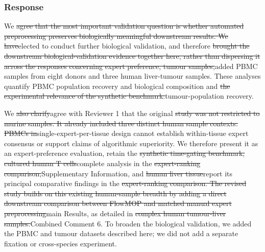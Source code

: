 \documentclass[
  11pt,
  a4paper,
]{article}
\begin{document}
\subsubsection{Response}\label{response-2}

We {\color{revisionred}\sout{agree that the most important validation
question is whether automated preprocessing preserves biologically
meaningful downstream results. We have}}{\color{revisionblue}elected to
conduct further biological validation, and} therefore
{\color{revisionred}\sout{brought the downstream biological-validation
evidence together here, rather than dispersing it across the responses
concerning expert preference, tumour
samples,}}{\color{revisionblue}added PBMC samples from eight donors and
three human liver-tumour samples. These analyses quantify PBMC
population recovery and biological composition} and
{\color{revisionred}\sout{the experimental relevance of the synthetic
benchmark.}}{\color{revisionblue}tumour-population recovery.}

We {\color{revisionred}\sout{also clarify}}{\color{revisionblue}agree
with Reviewer 1} that the original {\color{revisionred}\sout{study was
not restricted to murine samples. It already included three distinct
human sample contexts: PBMCs
in}}{\color{revisionblue}single-expert-per-tissue design cannot
establish within-tissue expert consensus or support claims of
algorithmic superiority. We therefore present it as an expert-preference
evaluation, retain} the {\color{revisionred}\sout{synthetic time-gating
benchmark, cultured human T cells}}{\color{revisionblue}complete
analysis} in the {\color{revisionred}\sout{expert-ranking
comparison,}}{\color{revisionblue}Supplementary Information,} and
{\color{revisionred}\sout{human liver
tissue}}{\color{revisionblue}report its principal comparative findings}
in the {\color{revisionred}\sout{expert-ranking comparison. The revised
study builds on this existing human-sample breadth by adding a direct
downstream comparison between FlowMOP and matched manual expert
preprocessing}}{\color{revisionblue}main Results, as detailed} in
{\color{revisionred}\sout{complex human tumour-liver
samples.}}{\color{revisionblue}Combined Comment 6. To broaden the
biological validation, we added the PBMC and tumour datasets described
here; we did not add a separate fixation or cross-species experiment.}
\end{document}
